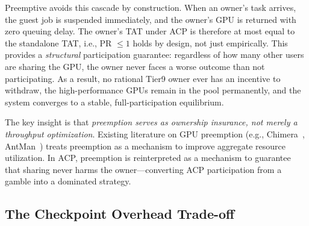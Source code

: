 Preemptive avoids this cascade by construction.
When an owner's task arrives, the guest job is suspended immediately,
and the owner's GPU is returned with zero queuing delay.
The owner's TAT under ACP is therefore at most equal to the standalone TAT,
i.e., PR $\leq 1$ holds by design, not just empirically.
This provides a \emph{structural} participation guarantee:
regardless of how many other users are sharing the GPU,
the owner never faces a worse outcome than not participating.
As a result, no rational Tier9 owner ever has an incentive to withdraw,
the high-performance GPUs remain in the pool permanently,
and the system converges to a stable, full-participation equilibrium.


The key insight is that \emph{preemption serves as ownership insurance,
not merely a throughput optimization}.
Existing literature on GPU preemption (e.g., Chimera~\cite{han2023chimera},
AntMan~\cite{xiao2020antman}) treats preemption as a mechanism to improve
aggregate resource utilization.
In ACP, preemption is reinterpreted as a mechanism to guarantee that
sharing never harms the owner---converting ACP participation from a
gamble into a dominated strategy.


\subsection{The Checkpoint Overhead Trade-off}
\label{sec:discussion_overhead}

